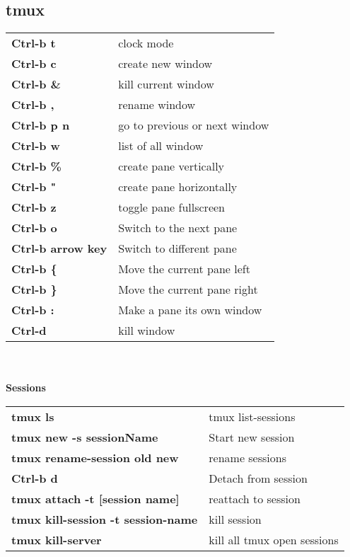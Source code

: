 \documentclass[10pt,landscape]{article}
\begin{document}
\begin{multicols}{3}
\vfill
\columnbreak

\section*{tmux}
\vspace{-0.7em}
\begin{tabular}{l l}
\textbf{Ctrl-b t} & clock mode\\
\textbf{Ctrl-b c} & create new window\\
\textbf{Ctrl-b \&} & kill current window\\
\textbf{Ctrl-b ,} & rename window\\
\textbf{Ctrl-b p n} & go to previous or next window\\
\textbf{Ctrl-b w} & list of all window\\
\textbf{Ctrl-b \%} & create pane vertically\\
\textbf{Ctrl-b "} & create pane horizontally\\
\textbf{Ctrl-b z} & toggle pane fullscreen\\
\textbf{Ctrl-b o} & Switch to the next pane\\
\textbf{Ctrl-b arrow key} & Switch to different pane\\
\textbf{Ctrl-b \{} & Move the current pane left\\
\textbf{Ctrl-b \}} & Move the current pane right\\
\textbf{Ctrl-b :} & Make a pane its own window\\
\textbf{Ctrl-d} & kill window\\
\end{tabular}
\\ \\
\textbf{Sessions}
\\
\begin{tabular}{l l}
\textbf{tmux ls} & tmux list-sessions\\
\textbf{tmux new -s sessionName} & Start new session\\
\textbf{tmux rename-session old new} & rename sessions\\
\textbf{Ctrl-b d} & Detach from session\\
\textbf{tmux attach -t [session name]} & reattach to session\\
\textbf{tmux kill-session -t session-name} & kill session\\
\textbf{tmux kill-server} & kill all tmux open sessions\\
\end{tabular}


\end{multicols}
\end{document}
